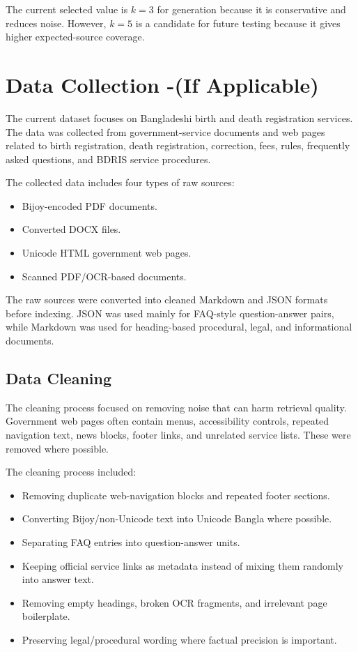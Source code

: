 The current selected value is $k=3$ for generation because it is conservative and reduces noise. However, $k=5$ is a candidate for future testing because it gives higher expected-source coverage.

\section{Data Collection -(If Applicable)}

The current dataset focuses on Bangladeshi birth and death registration services. The data was collected from government-service documents and web pages related to birth registration, death registration, correction, fees, rules, frequently asked questions, and BDRIS service procedures.

The collected data includes four types of raw sources:

\begin{itemize}
    \item Bijoy-encoded PDF documents.
    \item Converted DOCX files.
    \item Unicode HTML government web pages.
    \item Scanned PDF/OCR-based documents.
\end{itemize}

The raw sources were converted into cleaned Markdown and JSON formats before indexing. JSON was used mainly for FAQ-style question-answer pairs, while Markdown was used for heading-based procedural, legal, and informational documents.

\subsection{Data Cleaning}

The cleaning process focused on removing noise that can harm retrieval quality. Government web pages often contain menus, accessibility controls, repeated navigation text, news blocks, footer links, and unrelated service lists. These were removed where possible.

The cleaning process included:

\begin{itemize}
    \item Removing duplicate web-navigation blocks and repeated footer sections.
    \item Converting Bijoy/non-Unicode text into Unicode Bangla where possible.
    \item Separating FAQ entries into question-answer units.
    \item Keeping official service links as metadata instead of mixing them randomly into answer text.
    \item Removing empty headings, broken OCR fragments, and irrelevant page boilerplate.
    \item Preserving legal/procedural wording where factual precision is important.
\end{itemize}

